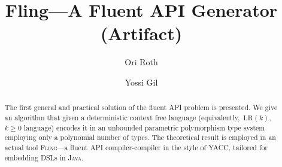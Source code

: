 \documentclass[a4paper,UKenglish,cleveref, autoref]{darts-v2019}
\title{Fling---A Fluent API Generator (Artifact)}
\author{Ori Roth}{Technion I.I.T Computer Science Dept., Haifa, Israel}{ori.rothh@gmail.com}{}{Technion I.I.T}%
\author{Yossi Gil}{Technion I.I.T Computer Science Dept., Haifa, Israel}{yogi@cs.technion.ac.il}{}{Technion I.I.T}
\newcommand{\Fling}{F\textsc{ling}\xspace}
\begin{document}
\maketitle

\begin{abstract}
The first general and practical solution of the fluent API problem is
presented. We give an algorithm that given a deterministic context free
language (equivalently,~$\text{LR}(k)$,~$k\ge 0$ language) encodes it in an
unbounded parametric polymorphism type system employing only a polynomial
number of types. The theoretical result is employed in an actual tool
\Fling---a fluent API compiler-compiler in the style of YACC, tailored for
embedding DSLs in \textsc{Java}.


\end{abstract}

\end{document}
